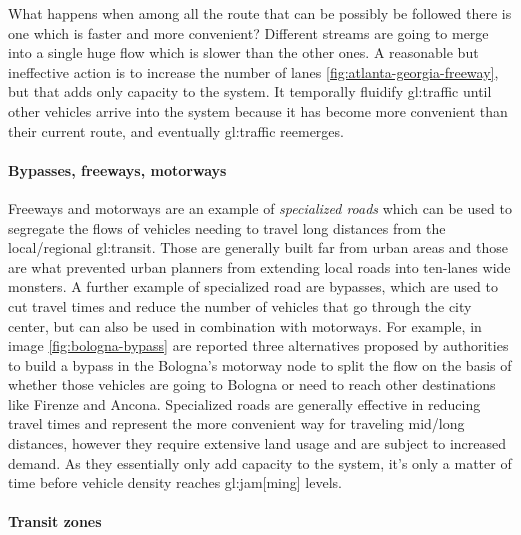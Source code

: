 What happens when among all the route that can be possibly be followed there is one which is faster and more convenient? Different streams are going to merge into a single huge flow which is slower than the other ones. A reasonable but ineffective action is to increase the number of lanes \ref{fig:atlanta-georgia-freeway}, but that adds only capacity to the system. It temporally fluidify \gls{gl:traffic} until other vehicles arrive into the system because it has become more convenient than their current route, and eventually \gls{gl:traffic} reemerges.


\paragraph{Bypasses, freeways, motorways}

Freeways and motorways are an example of \textit{specialized roads} which can be used to segregate the flows of vehicles needing to travel long distances from the local/regional \gls{gl:transit}. Those are generally built far from urban areas and those are what prevented urban planners from extending local roads into ten-lanes wide monsters. A further example of specialized road are bypasses, which are used to cut travel times and reduce the number of vehicles that go through the city center, but can also be used in combination with motorways. For example, in image \ref{fig:bologna-bypass} are reported three alternatives proposed by authorities to build a bypass in the Bologna's motorway node to split the flow on the basis of whether those vehicles are going to Bologna or need to reach other destinations like Firenze and Ancona. Specialized roads are generally effective in reducing travel times and represent the more convenient way for traveling mid/long distances, however they require extensive land usage and are subject to increased demand. As they essentially only add capacity to the system, it's only a matter of time before vehicle density reaches \gls{gl:jam}[ming] levels.


\paragraph{Transit zones}

